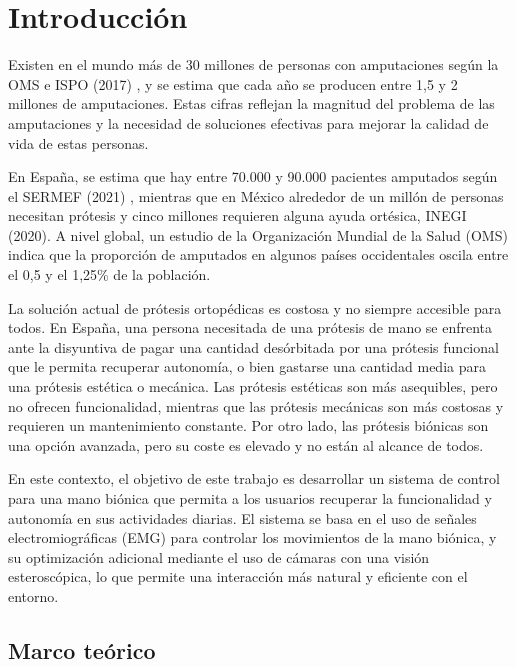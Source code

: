 
\cleardoublepage

\chapter{Introducción}
\label{introduccion}

Existen en el mundo más de 30 millones de personas con amputaciones según la OMS e ISPO (2017) \citep{whodata1}, y se estima que cada año se producen entre 1,5 y 2 millones de amputaciones. Estas cifras reflejan la magnitud del problema de las amputaciones y la necesidad de soluciones efectivas para mejorar la calidad de vida de estas personas.

En España, se estima que hay entre 70.000 y 90.000 pacientes amputados según el SERMEF (2021) , mientras que en México alrededor de un millón de personas necesitan prótesis y cinco millones requieren alguna ayuda ortésica, INEGI (2020). A nivel global, un estudio de la Organización Mundial de la Salud (OMS) indica que la proporción de amputados en algunos países occidentales oscila entre el 0,5 y el 1,25\% de la población. 

La solución actual de prótesis ortopédicas es costosa y no siempre accesible para todos. En España, una persona necesitada de una prótesis de mano se enfrenta ante la disyuntiva de pagar una cantidad desórbitada por una prótesis funcional que le permita recuperar autonomía, o bien gastarse una cantidad media para una prótesis estética o mecánica. Las prótesis estéticas son más asequibles, pero no ofrecen funcionalidad, mientras que las prótesis mecánicas son más costosas y requieren un mantenimiento constante. Por otro lado, las prótesis biónicas son una opción avanzada, pero su coste es elevado y no están al alcance de todos.

En este contexto, el objetivo de este trabajo es desarrollar un sistema de control para una mano biónica que permita a los usuarios recuperar la funcionalidad y autonomía en sus actividades diarias. El sistema se basa en el uso de señales electromiográficas (EMG) para controlar los movimientos de la mano biónica, y su optimización adicional mediante el uso de cámaras con una visión esteroscópica, lo que permite una interacción más natural y eficiente con el entorno.


\section{Marco teórico}
\label{marco-teorico}

